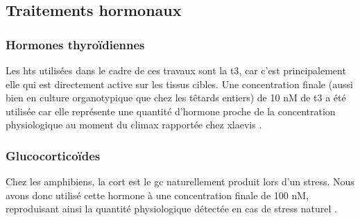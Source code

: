 \documentclass[../main.tex]{subfiles}
\begin{document}

\subsection{Traitements hormonaux}

\subsubsection{Hormones thyroïdiennes}
Les \glspl{ht} utilisées dans le cadre de ces travaux sont la \gls{t3}, car c'est principalement elle qui est directement active sur les tissus cibles.
Une concentration finale (aussi bien en culture organotypique que chez les têtards entiers) de 10 nM de \gls{t3} a été utilisée car elle représente une quantité d'hormone proche de la concentration physiologique au moment du climax rapportée chez \gls{xlaevis} \citep{Leloup1977}.

\subsubsection{Glucocorticoïdes}
Chez les amphibiens, la \gls{cort} est le \gls{gc} naturellement produit lors d'un stress.
Nous avons donc utilisé cette hormone à une concentration finale de 100 nM, reproduisant ainsi la quantité physiologique détectée en cas de stress naturel \citep{JolivetJaudet1984,Krain2004}.
\end{document}
